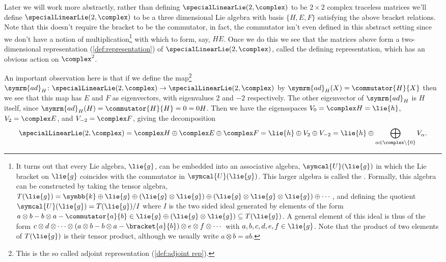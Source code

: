 \documentclass[fleqn]{NotesClass}
\renewcommand{\field}{\symbb{k}}
\newcommand{\ad}{\symrm{ad}}
\begin{document}
    Later we will work more abstractly, rather than defining \(\specialLinearLie(2, \complex)\) to be \(2 \times 2\) complex traceless matrices we'll define \(\specialLinearLie(2, \complex)\) to be a three dimensional Lie algebra with basis \(\{H, E, F\}\) satisfying the above bracket relations.
    Note that this doesn't require the bracket to be the commutator, in fact, the commutator isn't even defined in this abstract setting since we don't have a notion of multiplication\footnote{It turns out that every Lie algebra, \(\lie{g}\), can be embedded into an associative algebra, \(\symcal{U}(\lie{g})\) in which the Lie bracket on \(\lie{g}\) coincides with the commutator in \(\symcal{U}(\lie{g})\). This larger algebra is called the . Formally, this algebra can be constructed by taking the tensor algebra, \(T(\lie{g}) = \field \oplus \lie{g} \oplus (\lie{g} \otimes \lie{g}) \oplus (\lie{g} \otimes \lie{g} \otimes \lie{g}) \oplus \dotsb\), and defining the quotient \(\symcal{U}(\lie{g}) = T(\lie{g})/I\) where \(I\) is the two sided ideal generated by elements of the form \(a \otimes b - b \otimes a - \commutator{a}{b} \in \lie{g} \oplus (\lie{g} \otimes \lie{g}) \subseteq T(\lie{g})\). A general element of this ideal is thus of the form \(c \otimes d \otimes \dotsb \otimes (a \otimes b - b \otimes a - \bracket{a}{b}) \otimes e \otimes f \otimes \dotsb\) with \(a, b, c, d, e, f \in \lie{g}\). Note that the product of two elements of \(T(\lie{g})\) is their tensor product, although we usually write \(a \otimes b = ab\).} with which to form, say, \(HE\).
    Once we do this we see that the matrices above form a two-dimensional representation (\cref{def:representation}) of \(\specialLinearLie(2, \complex)\), called the defining representation, which has an obvious action on \(\complex^2\).
    
    An important observation here is that if we define the map\footnote{This is the so called adjoint representation (\cref{def:adjoint rep}).} \(\ad_H \colon \specialLinearLie(2, \complex) \to \specialLinearLie(2, \complex)\) by \(\ad_H(X) = \commutator{H}{X}\) then we see that this map has \(E\) and \(F\) as eigenvectors, with eigenvalues \(2\) and \(-2\) respectively.
    The other eigenvector of \(\ad_H\) is \(H\) itself, since \(\ad_H(H) = \commutator{H}{H} = 0 = 0H\).
    Then we have the eigensspaces \(V_0 = \complex H = \lie{h}\), \(V_2 = \complex E\), and \(V_{-2} = \complex F\), giving the decomposition
    \begin{equation}
        \specialLinearLie(2, \complex) = \complex H \oplus \complex E \oplus \complex F = \lie{h} \oplus V_2 \oplus V_{-2} = \lie{h} \oplus \bigoplus_{\alpha \in \complex \setminus \{0\}} V_{\alpha}.
    \end{equation}
    
\end{document}
